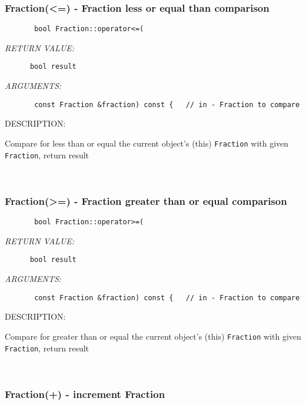 \subsubsection [Fraction(<=)] {Fraction(<=) - Fraction less or equal than comparison}


  
\begin{verbatim}       bool Fraction::operator<=(\end{verbatim}{\em RETURN VALUE:}
\begin{verbatim}      bool result\end{verbatim}{\em ARGUMENTS:}
\begin{verbatim}       const Fraction &fraction) const {   // in - Fraction to compare\end{verbatim}
{\sf DESCRIPTION:\\ }


        Compare for less than or equal the current object's (this)
        {\tt Fraction} with given {\tt Fraction}, return result
   
 
\mbox{}\hrulefill\ 
 
\subsubsection [Fraction(>=)] {Fraction(>=) - Fraction greater than or equal comparison}


  
\begin{verbatim}       bool Fraction::operator>=(\end{verbatim}{\em RETURN VALUE:}
\begin{verbatim}      bool result\end{verbatim}{\em ARGUMENTS:}
\begin{verbatim}       const Fraction &fraction) const {   // in - Fraction to compare\end{verbatim}
{\sf DESCRIPTION:\\ }


        Compare for greater than or equal the current object's (this)
        {\tt Fraction} with given {\tt Fraction}, return result
   
 
\mbox{}\hrulefill\ 
 
\subsubsection [Fraction(+)] {Fraction(+) - increment Fraction}


